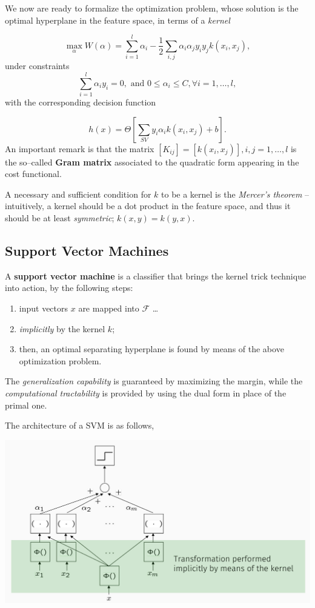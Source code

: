 \documentclass[10pt]{report}
\begin{document}
We now are ready to formalize the optimization problem, whose solution is the optimal hyperplane in the feature space, in terms of a \emph{kernel}

\[\max_{\alpha} W(\alpha) = \sum_{i=1}^l \alpha_i - \frac 1 2 \sum_{i,j} \alpha_i \alpha_j y_i y_j k(x_i,x_j),\]
under constraints
\[\sum_{i=1}^l \alpha_i y_i = 0, \mbox{ and } 0 \leq \alpha_i \leq C, \forall i=1,\dots,l,\] with the corresponding decision function

$$h(x) = \Theta\left[\sum_{SV} y_i\alpha_i k(x_i, x_j) + b\right].$$ An
important remark is that the matrix \([K_{ij}] = [k(x_i, x_j)], i,j=1,\dots,l\) is
the so--called \textbf{Gram matrix} associated to the quadratic form appearing in the
cost functional.

A necessary and sufficient condition for \(k\) to be a kernel is the \emph{Mercer's
theorem} -- intuitively, a kernel should be a dot product in the feature space,
and thus it should be at least \emph{symmetric}; \(k(x,y) = k(y,x)\).

\subsection{Support Vector Machines}
\label{sec:org32bcdc3}

A \textbf{support vector machine} is a classifier that brings the kernel trick technique into action, by the following steps:
\begin{enumerate}
\item input vectors \(x\) are mapped into \(\mathcal F\) \dots{}
\item \emph{implicitly} by the kernel \(k\);
\item then, an optimal separating hyperplane is found by means of the above optimization problem.
\end{enumerate}

The \emph{generalization capability} is guaranteed by maximizing the margin, while
the \emph{computational tractability} is provided by using the dual form in place of
the primal one.

The architecture of a SVM is as follows,

\begin{center}
\includegraphics[width=.9\linewidth]{./pics/svm/svm-architecture.jpg}
\end{center}
\end{document}
